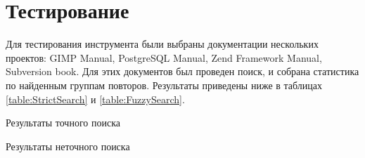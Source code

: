 \documentclass[14pt]{matmex-diploma-custom}
\begin{document}



\section{Тестирование}

Для тестирования инструмента были выбраны документации нескольких проектов: GIMP Manual, PostgreSQL Manual, Zend Framework Manual, Subversion book. Для этих документов был проведен поиск, и собрана статистика по найденным группам повторов. Результаты приведены ниже в таблицах \ref{table:StrictSearch} и \ref{table:FuzzySearch}.

\begin{table}[ht]
	\centering
	
	\caption{Результаты точного поиска}
	\label{table:StrictSearch}
\end{table}

\begin{table}[ht!]
	\centering
	
	\caption{Результаты неточного поиска}
	\label{table:FuzzySearch}
\end{table}


\newpage
\end{document}

